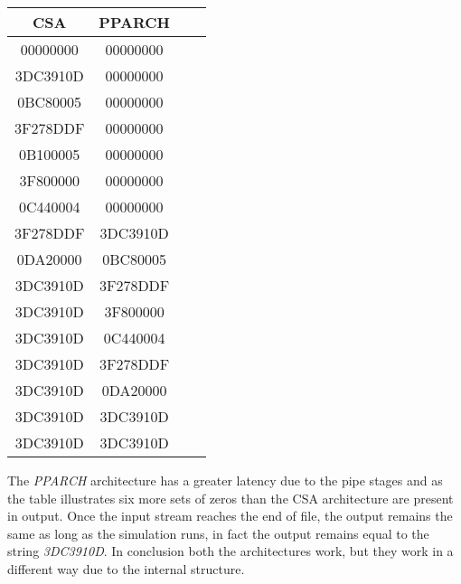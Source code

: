 \begin{table}[H]
\begin{center}
\begin{tabular}{|c|c|c|c|}				\hline
CSA		 	  & PPARCH 					\\ \hline
00000000   	  & 00000000               	\\ \hline
3DC3910D      & 00000000                \\ \hline
0BC80005      & 00000000                \\ \hline
3F278DDF      & 00000000                \\ \hline
0B100005      & 00000000                  \\ \hline
3F800000      & 00000000                  \\ \hline
0C440004      & 00000000                   \\ \hline
3F278DDF      & 3DC3910D                  \\ \hline
0DA20000      & 0BC80005                   \\ \hline
3DC3910D      & 3F278DDF                  \\ \hline
3DC3910D      & 3F800000                   \\ \hline
3DC3910D      & 0C440004                   \\ \hline
3DC3910D      & 3F278DDF                   \\ \hline
3DC3910D      & 0DA20000                   \\ \hline
3DC3910D      & 3DC3910D                   \\ \hline
3DC3910D      & 3DC3910D                   \\ \hline
\end{tabular}
\end{center}
\end{table}
The \textit{PPARCH} architecture has a greater latency due to the pipe stages and as the table illustrates six more sets of zeros than the CSA architecture are present in output. Once the input stream reaches the end of file, the output remains the same as long as the simulation runs, in fact the output remains equal to the string \textit{3DC3910D}. In conclusion both the architectures work, but they work in a different way due to the internal structure.


